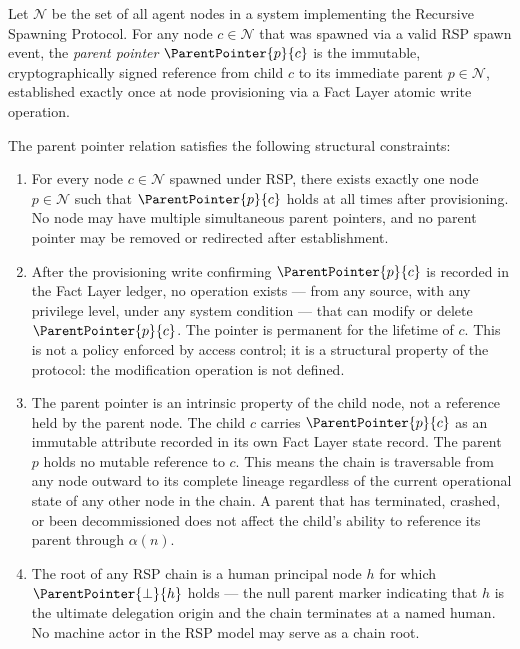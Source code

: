 \begin{definition}
\label{def:parent-pointer}
Let $\mathcal{N}$ be the set of all agent nodes in a \bxthree{} system implementing the Recursive Spawning Protocol. For any node $c \in \mathcal{N}$ that was spawned via a valid RSP spawn event, the \emph{parent pointer} $\ParentPointer{p}{c}$ is the immutable, cryptographically signed reference from child $c$ to its immediate parent $p \in \mathcal{N}$, established exactly once at node provisioning via a Fact Layer atomic write operation.

The parent pointer relation satisfies the following structural constraints:

\begin{enumerate}
    \item[(P1) \textbf{Uniqueness}] For every node $c \in \mathcal{N}$ spawned under RSP, there exists exactly one node $p \in \mathcal{N}$ such that $\ParentPointer{p}{c}$ holds at all times after provisioning. No node may have multiple simultaneous parent pointers, and no parent pointer may be removed or redirected after establishment.

    \item[(P2) \textbf{Immutability}] After the provisioning write confirming $\ParentPointer{p}{c}$ is recorded in the Fact Layer ledger, no operation exists --- from any source, with any privilege level, under any system condition --- that can modify or delete $\ParentPointer{p}{c}$. The pointer is permanent for the lifetime of $c$. This is not a policy enforced by access control; it is a structural property of the protocol: the modification operation is not defined.

    \item[(P3) \textbf{Directionality}] The parent pointer is an intrinsic property of the child node, not a reference held by the parent node. The child $c$ carries $\ParentPointer{p}{c}$ as an immutable attribute recorded in its own Fact Layer state record. The parent $p$ holds no mutable reference to $c$. This means the chain is traversable from any node outward to its complete lineage regardless of the current operational state of any other node in the chain. A parent that has terminated, crashed, or been decommissioned does not affect the child's ability to reference its parent through $\alpha(n)$.

    \item[(P4) \textbf{Termination at Human Anchor}] The root of any RSP chain is a human principal node $h$ for which $\ParentPointer{\bot}{h}$ holds --- the null parent marker indicating that $h$ is the ultimate delegation origin and the chain terminates at a named human. No machine actor in the RSP model may serve as a chain root.
\end{enumerate}
\end{definition}

